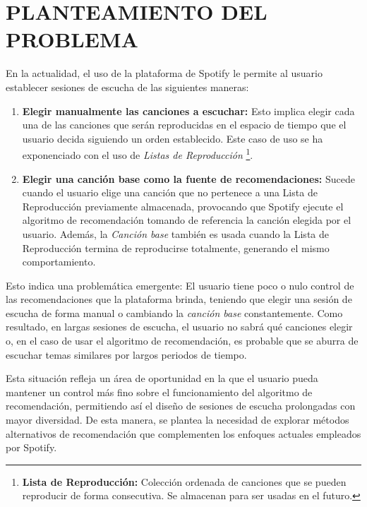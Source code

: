 \newpage

\section*{PLANTEAMIENTO DEL PROBLEMA}

En la actualidad, el uso de la plataforma de Spotify le permite al usuario establecer sesiones de escucha de las siguientes maneras:

\begin{enumerate}
    \item \textbf{Elegir manualmente las canciones a escuchar:} Esto implica elegir cada una de las canciones que serán reproducidas en el espacio de tiempo que el usuario decida siguiendo un orden establecido. Este caso de uso se ha exponenciado con el uso de \textit{Listas de Reproducción} \footnote{\textbf{Lista de Reproducción: } Colección ordenada de canciones que se pueden reproducir de forma consecutiva. Se almacenan para ser usadas en el futuro.}.

    \item \textbf{Elegir una canción base como la fuente de recomendaciones:} Sucede cuando el usuario elige una canción que no pertenece a una Lista de Reproducción previamente almacenada, provocando que Spotify ejecute el algoritmo de recomendación tomando de referencia la canción elegida por el usuario. Además, la \textit{Canción base} también es usada cuando la Lista de Reproducción termina de reproducirse totalmente, generando el mismo comportamiento.
\end{enumerate}

Esto indica una problemática emergente: El usuario tiene poco o nulo control de las recomendaciones que la plataforma brinda, teniendo que elegir una sesión de escucha de forma manual o cambiando la \textit{canción base} constantemente. Como resultado, en largas sesiones de escucha, el usuario no sabrá qué canciones elegir o, en el caso de usar el algoritmo de recomendación, es probable que se aburra de escuchar temas similares por largos periodos de tiempo.

Esta situación refleja un área de oportunidad en la que el usuario pueda mantener un control más fino sobre el funcionamiento del algoritmo de recomendación, permitiendo así el diseño de sesiones de escucha prolongadas con mayor diversidad. De esta manera, se plantea la necesidad de explorar métodos alternativos de recomendación que complementen los enfoques actuales empleados por Spotify.

